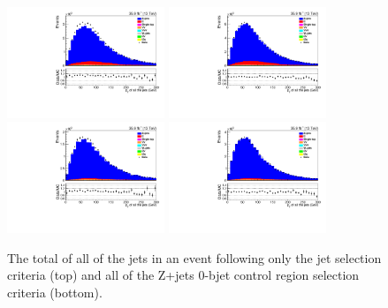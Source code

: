 \begin{figure}[ht]
\centering
\includegraphics[width=0.42\textwidth]{figs/background-estimation/plots/unblinded/DY_control_old_prompt_ee_ttbarInc/totalJetPt_SingleTop_jetSel_ee.pdf}
\includegraphics[width=0.42\textwidth]{figs/background-estimation/plots/unblinded/DY_control_old_prompt_mumu_ttbarInc/totalJetPt_SingleTop_jetSel_mumu.pdf}
\\
\includegraphics[width=0.42\textwidth]{figs/background-estimation/plots/unblinded/DY_control_old_prompt_ee_ttbarInc/totalJetPt_SingleTop_wMass_ee.pdf}
\includegraphics[width=0.42\textwidth]{figs/background-estimation/plots/unblinded/DY_control_old_prompt_mumu_ttbarInc/totalJetPt_SingleTop_wMass_mumu.pdf}
\caption{
The total \pT of all of the jets in an event following only the jet selection criteria (top) and all of the Z+jets 0-bjet control region selection criteria (bottom).
}
\label{fig:CR_LO_totalJetPt}
\end{figure}

